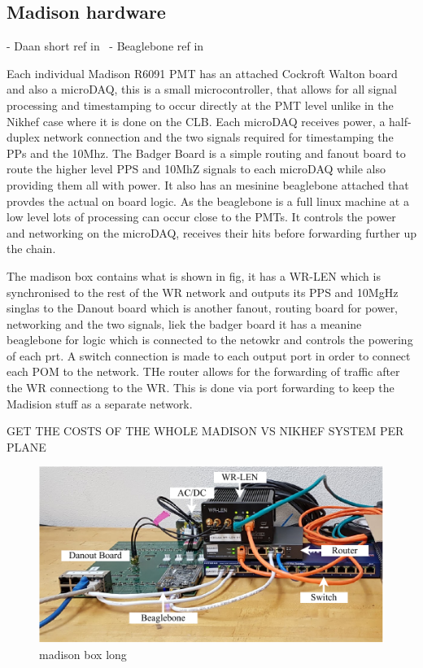 \subsection{Madison hardware} %
\label{sec:daq_hard_madison} %

- Daan short ref in~\cite{eijk2018}
- Beaglebone ref in~\cite{beagle2020}

Each individual Madison R6091 PMT has an attached Cockroft Walton board and also a microDAQ, this
is a small microcontroller, that allows for all signal processing and timestamping to occur
directly at the PMT level unlike in the Nikhef case where it is done on the CLB. Each microDAQ
receives power, a half-duplex network connection and the two signals required for timestamping the
PPs and the 10Mhz. The Badger Board is a simple routing and fanout board to route the higher level
PPS and 10MhZ signals to each microDAQ while also providing them all with power. It also has an
mesinine beaglebone attached that provdes the actual on board logic. As the beaglebone is a full
linux machine at a low level lots of processing can occur close to the PMTs. It controls the power
and networking on the microDAQ, receives their hits before forwarding further up the chain.

The madison box contains what is shown in fig, it has a WR-LEN which is synchronised to the rest
of the WR network and outputs its PPS and 10MgHz singlas to the Danout board which is another
fanout, routing board for power, networking and the two signals, liek the badger board it has a
meanine beaglebone for logic which is connected to the netowkr and controls the powering of each
prt. A switch connection is made to each output port in order to connect each POM to the network.
THe router allows for the forwarding of traffic after the WR connectiong to the WR. This is done
via port forwarding to keep the Madision stuff as  a separate network.

GET THE COSTS OF THE WHOLE MADISON VS NIKHEF SYSTEM PER PLANE

\begin{figure} %
    \includegraphics[width=\textwidth]{diagrams/5-daq/madison_box.pdf}
    \caption[madison box short]
    {madison box long}
    \label{fig:madison_box}
\end{figure}

